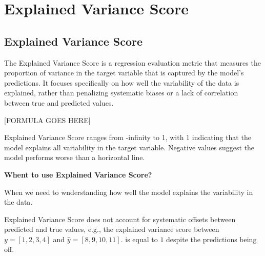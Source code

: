 \section{Explained Variance Score}
\subsection{Explained Variance Score}

The Explained Variance Score is a regression evaluation metric that measures the proportion of variance in the target variable that is captured by the model’s predictions.
It focuses specifically on how well the variability of the data is explained, rather than penalizing systematic biases or a lack of correlation between true and predicted values.

\begin{center}
    [FORMULA GOES HERE]
\end{center}

Explained Variance Score ranges from -infinity to 1, with 1 indicating that the model explains all variability in the target variable. Negative values suggest the model performs worse
than a horizontal line.

\textbf{Whent to use Explained Variance Score?}

When we need to wnderstanding how well the model explains the variability in the data.

{
    \item Explained Variance Score does not account for systematic offsets between predicted and true values, e.g., the explained variance score between 
    \( y=[1, 2, 3, 4] \) and \( \hat{y}=[8, 9, 10, 11] \). is equal to $1$ despite the predictions being off.
}
